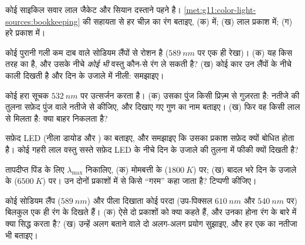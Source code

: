 \begin{exercise}[$\star\star$]\label{exo:g11:color-light-sources:7}
कोई साइकिल सवार लाल जैकेट और सियान दस्ताने पहने है। \cref{met:g11:color-light-sources:bookkeeping} की सहायता से
हर चीज़ का  रंग बताइए, (क)  में; (ख) लाल प्रकाश
में; (ग) हरे प्रकाश में।
\end{exercise}

\begin{exercise}[$\star\star$]\label{exo:g11:color-light-sources:8}
कोई पुरानी गली कम दाब वाले सोडियम लैंपों से रोशन है ($\qty{589}{nm}$
पर एक ही रेखा)। (क) यह किस तरह का  है, और उसके नीचे
\emph{कोई भी} वस्तु कौन-से रंग ले सकती है? (ख) कोई कार उन लैंपों के नीचे
काली दिखती है और दिन के उजाले में नीली: समझाइए।
\end{exercise}

\begin{exercise}[$\star\star$]\label{exo:g11:color-light-sources:9}
कोई हरा  सूचक $\qty{532}{nm}$ पर उत्सर्जन करता है। (क) उसका पुंज
किसी प्रिज़्म से गुज़रता है: नतीजे की तुलना सफ़ेद पुंज वाले नतीजे से
कीजिए, और दिखाए गए गुण का नाम बताइए। (ख) फिर वह किसी लाल
 से मिलता है: क्या बाहर निकलता है?
\end{exercise}

\begin{exercise}[$\star\star$]\label{exo:g11:color-light-sources:10}
सफ़ेद LED (नीला डायोड और ) का 
बताइए, और समझाइए कि उसका प्रकाश सफ़ेद क्यों बोधित होता है। कोई गहरी लाल
वस्तु सस्ते सफ़ेद LED के नीचे दिन के उजाले की तुलना में फीकी क्यों दिखती
है?
\end{exercise}

\begin{exercise}[$\star\star$]\label{exo:g11:color-light-sources:11}
तापदीप्त पिंड के लिए $\lambda_{\max}$ निकालिए, (क) मोमबत्ती के 
($\qty{1800}{K}$) पर; (ख) बादल भरे दिन के उजाले के ($\qty{6500}{K}$) पर। उन दोनों
प्रकाशों में से किसे ``गरम'' कहा जाता है? टिप्पणी कीजिए।
\end{exercise}

\begin{exercise}[$\star\star\star$]\label{exo:g11:color-light-sources:12}
कोई सोडियम लैंप ($\qty{589}{nm}$) और पीला दिखाता कोई परदा (उप-पिक्सल $\qty{610}{nm}$ और
$\qty{540}{nm}$ पर) बिलकुल एक ही रंग के दिखते हैं। (क) ऐसे दो प्रकाशों को क्या
कहते हैं, और उनका होना रंग के बारे में क्या सिद्ध करता है? (ख) उन्हें
अलग बताने वाले दो अलग-अलग प्रयोग सुझाइए, और हर एक का नतीजा भी बताइए।
\end{exercise}

